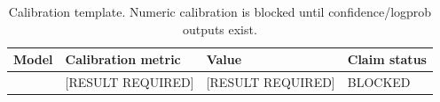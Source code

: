 \begin{table}[t]
\centering
\caption{Calibration template. Numeric calibration is blocked until confidence/logprob outputs exist.}
\begin{tabular}{llll}
\toprule
Model & Calibration metric & Value & Claim status \\
\midrule
[RESULT REQUIRED] & [RESULT REQUIRED] & [RESULT REQUIRED] & BLOCKED \\
\bottomrule
\end{tabular}
\end{table}

